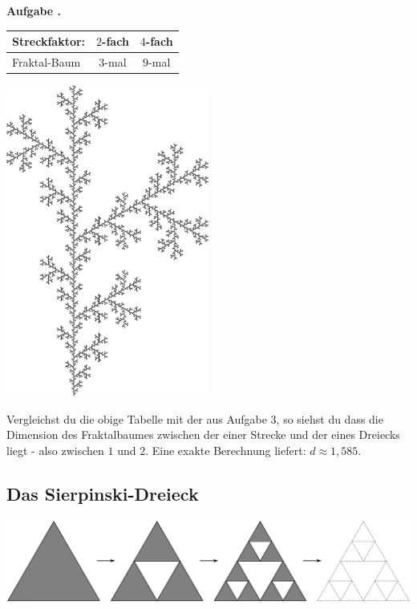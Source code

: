 \documentclass[a4paper,ngerman,12pt]{scrartcl}
\theoremstyle{definition}
\theoremstyle{plain}
\theoremstyle{remark}
\newlength{\aufgabenskip}
\newcounter{aufgabennummer}
\newenvironment{aufgabe}[1]{
  \addtocounter{aufgabennummer}{1}
  \textbf{Aufgabe \theaufgabennummer.} \emph{#1} \par
}{\vspace{\aufgabenskip}}
\begin{document}
\begin{aufgabe}{}
	\begin{minipage}{\textwidth}
		\begin{minipage}[t]{0.7\textwidth}
			\renewcommand{\arraystretch}{2}
			\begin{center}
				\begin{tabular}{l||c|c}
				Streckfaktor:& $2$-fach & $4$-fach \\\hline\hline
				Fraktal-Baum & $3$-mal & $9$-mal \\	
			\end{tabular}
			\end{center}
		\end{minipage}
		\begin{minipage}[t]{0.2\textwidth}\vspace{-1.5cm}
			\includegraphics[width=0.5\textwidth]{Bilder/Baum.pdf}
		\end{minipage}
	\end{minipage}
	
	Vergleichst du die obige Tabelle mit der aus Aufgabe 3, so siehst du dass die Dimension des Fraktalbaumes zwischen der einer Strecke und der eines Dreiecks liegt - also zwischen $1$ und $2$. Eine exakte Berechnung liefert: $d \approx 1,585$.
\end{aufgabe}


\subsection{Das Sierpinski-Dreieck}

\begin{center}
	\includegraphics[width=.7\textwidth]{Bilder/Sierpinski-Konstruktion.pdf}
\end{center}
\end{document}
